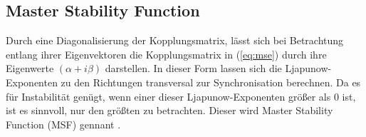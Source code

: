 \subsection*{Master Stability Function}
Durch eine Diagonalisierung der Kopplungsmatrix, lässt sich bei Betrachtung entlang ihrer Eigenvektoren die Kopplungsmatrix in (\ref{eq:mse}) durch ihre Eigenwerte $(\alpha+i\beta)$ darstellen. In dieser Form lassen sich die Ljapunow-Exponenten zu den Richtungen transversal zur Synchronisation berechnen. Da es für Instabilität genügt, wenn einer dieser Ljapunow-Exponenten größer als 0 ist, ist es sinnvoll, nur den größten zu betrachten. Dieser wird Master Stability Function (MSF) gennant \cite{pecora1998}. 



